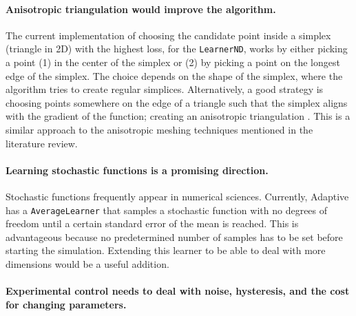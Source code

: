 \documentclass[english, twocolumn, 10pt, aps, superscriptaddress, floatfix, prb, citeautoscript]{revtex4-1}
\renewcommand{\citep}{\cite}
\newcommand{\passthrough}[1]{\lstset{mathescape=false}#1\lstset{mathescape=true}}
\begin{document}
\hypertarget{anisotropic-triangulation-would-improve-the-algorithm.}{%
\paragraph{Anisotropic triangulation would improve the algorithm.}\label{anisotropic-triangulation-would-improve-the-algorithm.}}

The current implementation of choosing the candidate point inside a simplex (triangle in 2D) with the highest loss, for the \passthrough{\lstinline!LearnerND!}, works by either picking a point (1) in the center of the simplex or (2) by picking a point on the longest edge of the simplex.
The choice depends on the shape of the simplex, where the algorithm tries to create regular simplices.
Alternatively, a good strategy is choosing points somewhere on the edge of a triangle such that the simplex aligns with the gradient of the function; creating an anisotropic triangulation \citep{Dyn1990}.
This is a similar approach to the anisotropic meshing techniques mentioned in the literature review.

\hypertarget{learning-stochastic-functions-is-a-promising-direction.}{%
\paragraph{Learning stochastic functions is a promising direction.}\label{learning-stochastic-functions-is-a-promising-direction.}}

Stochastic functions frequently appear in numerical sciences.
Currently, Adaptive has a \passthrough{\lstinline!AverageLearner!} that samples a stochastic function with no degrees of freedom until a certain standard error of the mean is reached.
This is advantageous because no predetermined number of samples has to be set before starting the simulation.
Extending this learner to be able to deal with more dimensions would be a useful addition.

\hypertarget{experimental-control-needs-to-deal-with-noise-hysteresis-and-the-cost-for-changing-parameters.}{%
\paragraph{Experimental control needs to deal with noise, hysteresis, and the cost for changing parameters.}\label{experimental-control-needs-to-deal-with-noise-hysteresis-and-the-cost-for-changing-parameters.}}
\end{document}
